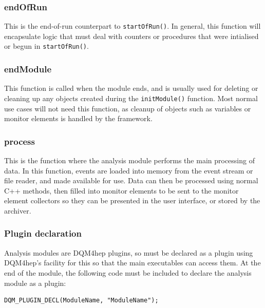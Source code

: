 

\subsubsection{endOfRun}
This is the end-of-run counterpart to \texttt{startOfRun()}. In general, this function will encapsulate logic that must deal with counters or procedures that were intialised or begun in \texttt{startOfRun()}.

\subsubsection{endModule}
This function is called when the module ends, and is usually used for deleting or cleaning up any objects created during the \texttt{initModule()} function. Most normal use cases will not need this function, as cleanup of objects such as variables or monitor elements is handled by the framework.

\subsubsection{process}
This is the function where the analysis module performs the main processing of data. In this function, events are loaded into memory from the event stream or file reader, and made available for use. Data can then be processed using normal C++ methods, then filled into monitor elements to be sent to the monitor element collectors so they can be presented in the user interface, or stored by the archiver.

\subsubsection{Plugin declaration}
Analysis modules are \acrshort{DQM4hep} plugins, so must be declared as a plugin using \acrshort{DQM4hep}'s facility for this so that the main executables can access them. At the end of the module, the following code must be included to declare the analysis module as a plugin:

\begin{lstlisting}
DQM_PLUGIN_DECL(ModuleName, "ModuleName");
\end{lstlisting}


